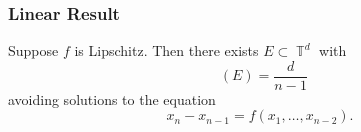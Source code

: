 \documentclass[handout,usenames,dvipsnames]{beamer}
\DeclareMathOperator{\TT}{\mathbb{T}}
\DeclareMathOperator{\fordim}{\text{dim}_{\mathbb{F}}}
\begin{document}
\begin{frame}
    \frametitle{Linear Result}

    \begin{theorem}
        Suppose $f$ is Lipschitz. Then there exists $E \subset \TT^d$ with
        \[ \fordim(E) = \frac{d}{n-1} \]
        avoiding solutions to the equation
        \[ x_n - x_{n-1} = f(x_1,\dots,x_{n-2}). \]
    \end{theorem}
\end{frame}
\end{document}
